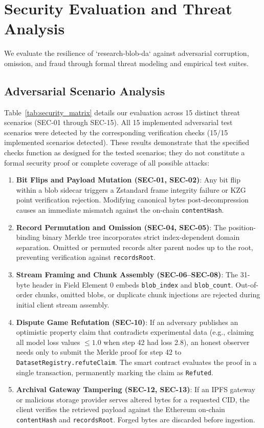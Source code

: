 \section{Security Evaluation and Threat Analysis}
\label{sec:security}

We evaluate the resilience of `research-blob-da` against adversarial corruption, omission, and fraud through formal threat modeling and empirical test suites.



\subsection{Adversarial Scenario Analysis}
Table~\ref{tab:security_matrix} details our evaluation across 15 distinct threat scenarios (SEC-01 through SEC-15). All 15 implemented adversarial test scenarios were detected by the corresponding verification checks (15/15 implemented scenarios detected). These results demonstrate that the specified checks function as designed for the tested scenarios; they do not constitute a formal security proof or complete coverage of all possible attacks:

\begin{enumerate}
    \item \textbf{Bit Flips and Payload Mutation (SEC-01, SEC-02)}: Any bit flip within a blob sidecar triggers a Zstandard frame integrity failure or KZG point verification rejection. Modifying canonical bytes post-decompression causes an immediate mismatch against the on-chain \texttt{contentHash}.
    \item \textbf{Record Permutation and Omission (SEC-04, SEC-05)}: The position-binding binary Merkle tree incorporates strict index-dependent domain separation. Omitted or permuted records alter parent nodes up to the root, preventing verification against \texttt{recordsRoot}.
    \item \textbf{Stream Framing and Chunk Assembly (SEC-06--SEC-08)}: The 31-byte header in Field Element 0 embeds \texttt{blob\_index} and \texttt{blob\_count}. Out-of-order chunks, omitted blobs, or duplicate chunk injections are rejected during initial client stream assembly.
    \item \textbf{Dispute Game Refutation (SEC-10)}: If an adversary publishes an optimistic property claim that contradicts experimental data (e.g., claiming all model loss values $\le 1.0$ when step 42 had loss 2.8), an honest observer needs only to submit the Merkle proof for step 42 to \texttt{DatasetRegistry.refuteClaim}. The smart contract evaluates the proof in a single transaction, permanently marking the claim as \texttt{Refuted}.
    \item \textbf{Archival Gateway Tampering (SEC-12, SEC-13)}: If an IPFS gateway or malicious storage provider serves altered bytes for a requested CID, the client verifies the retrieved payload against the Ethereum on-chain \texttt{contentHash} and \texttt{recordsRoot}. Forged bytes are discarded before ingestion.
\end{enumerate}

